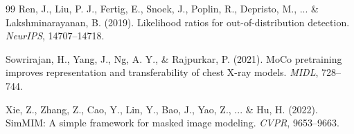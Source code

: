 \documentclass[11pt,a4paper]{article}
\begin{document}
\begin{thebibliography}{99}
Ren, J., Liu, P. J., Fertig, E., Snoek, J., Poplin, R., Depristo, M., ... \& Lakshminarayanan, B. (2019).
Likelihood ratios for out-of-distribution detection.
\textit{NeurIPS}, 14707--14718.

Sowrirajan, H., Yang, J., Ng, A. Y., \& Rajpurkar, P. (2021).
MoCo pretraining improves representation and transferability of chest X-ray models.
\textit{MIDL}, 728--744.

Xie, Z., Zhang, Z., Cao, Y., Lin, Y., Bao, J., Yao, Z., ... \& Hu, H. (2022).
SimMIM: A simple framework for masked image modeling.
\textit{CVPR}, 9653--9663.

\end{thebibliography}
\end{document}
